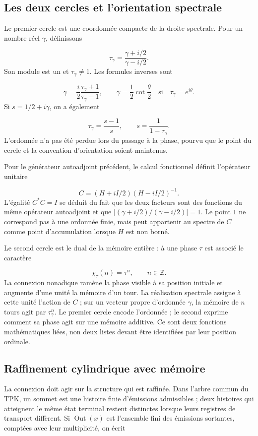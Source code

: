 \subsection{Les deux cercles et l’orientation spectrale}
\label{viii:rz:circulos}
Le premier cercle est une coordonnée compacte de la droite spectrale. Pour un nombre réel \(\gamma\), définissons

\[
\tau_\gamma=\frac{\gamma+i/2}{\gamma-i/2}.
\]
Son module est un et \(\tau_\gamma\neq1\). Les formules inverses sont

\[
\gamma=\frac{i}{2}\frac{\tau_\gamma+1}{\tau_\gamma-1},
\qquad
\gamma=\frac12\cot\frac{\theta}{2}
\quad\text{si}\quad\tau_\gamma=e^{i\theta}.
\]
Si \(s=1/2+i\gamma\), on a également

\[
\tau_\gamma=\frac{s-1}{s},\qquad s=\frac1{1-\tau_\gamma}.
\]
L’ordonnée n’a pas été perdue lors du passage à la phase, pourvu que le point du cercle et la convention d’orientation soient maintenus.

Pour le générateur autoadjoint précédent, le calcul fonctionnel définit l'opérateur unitaire

\[
C=(H+iI/2)(H-iI/2)^{-1}.
\]
L'égalité \(C^*C=I\) se déduit du fait que les deux facteurs sont des fonctions du même opérateur autoadjoint et que \(|(\gamma+i/2)/(\gamma-i/2)|=1\). Le point \(1\) ne correspond pas à une ordonnée finie, mais peut appartenir au spectre de \(C\) comme point d'accumulation lorsque \(H\) est non borné.

Le second cercle est le dual de la mémoire entière : à une phase \(\tau\) est associé le caractère

\[
\chi_\tau(n)=\tau^n,\qquad n\in\mathbb Z.
\]
La connexion nonadique ramène la phase visible à sa position initiale et augmente d’une unité la mémoire d’un tour. La réalisation spectrale assigne à cette unité l’action de \(C\) ; sur un vecteur propre d’ordonnée \(\gamma\), la mémoire de \(n\) tours agit par \(\tau_\gamma^n\). Le premier cercle encode l’ordonnée ; le second exprime comment sa phase agit sur une mémoire additive. Ce sont deux fonctions mathématiques liées, non deux listes devant être identifiées par leur position ordinale.

\subsection{Raffinement cylindrique avec mémoire}
\label{viii:rz:refinamiento}
La connexion doit agir sur la structure qui est raffinée. Dans l'arbre commun du TPK, un sommet est une histoire finie d'émissions admissibles ; deux histoires qui atteignent le même état terminal restent distinctes lorsque leurs registres de transport diffèrent. Si \(\operatorname{Out}(x)\) est l'ensemble fini des émissions sortantes, comptées avec leur multiplicité, on écrit

